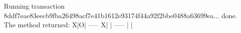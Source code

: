 \begin{shellbox}\begin{ttlst}
Running transaction 8ddf7eae83eecb9fba26498acf7e41b1612e93174f44a92f2bbe0488a63699ea... done.
The method returned:
X|O| 
-----
X| | 
-----
 | | 
\end{ttlst}\end{shellbox}
